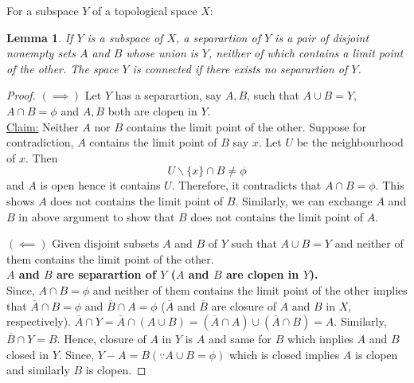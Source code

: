 \documentclass[12pt,reqno]{amsart}
\theoremstyle{plain}
\newtheorem{lem}{Lemma}
\theoremstyle{definition}
\begin{document}
\noindent For a subspace $Y$ of a topological space $X$:
\begin{lem}
    If $Y$ is a subspace of $X$, a separartion of $Y$ is a pair of disjoint nonempty sets $A$ and $B$ whose union is $Y$, neither of which contains a limit point of the other. The space $Y$ is connected if there exists no separartion of $Y$.
\end{lem}

\begin{proof}
    $(\implies)$ Let $Y$ has a separartion, say $A, B$, such that $A \cup B = Y$, $A \cap B = \phi$ and $A, B$ both are clopen in $Y$. \\
    \underline{Claim:} Neither $A$ nor $B$ contains the limit point of the other.
    Suppose for contradiction, $A$ contains the limit point of $B$ say $x$. Let $U$ be the neighbourhood of $x$. Then
    $$ U\backslash\{x\} \cap B \neq \phi$$
    and $A$ is open hence it contains $U$. Therefore, it contradicts that $A \cap B = \phi$. This shows $A$ does not contains the limit point of $B$. Similarly, we can exchange $A$ and $B$ in above argument to show that $B$ does not contains the limit point of $A$.

    \noindent $(\impliedby)$ Given disjoint subsets $A$ and $B$ of $Y$ such that $A \cup B = Y$ and neither of them contains the limit point of the other.\\  {\bf $A$ and $B$ are separartion of $Y$ ($A$ and $B$ are clopen in $Y$).} \\
    Since, $A \cap B = \phi$ and neither of them contains the limit point of the other implies that $\overline{A} \cap B = \phi$ and $\overline{B} \cap A = \phi$ ($\overline{A}$ and $\overline{B}$ are closure of $A$ and $B$ in $X$, respectively). $\overline{A} \cap Y = \overline{A} \cap (A \cup B) = (\overline{A} \cap A) \cup (\overline{A} \cap B) = A$. Similarly, $\overline{B} \cap Y = B$. Hence, closure of $A$ in $Y$ is $A$ and same for $B$ which implies $A$ and $B$ closed in $Y$. Since, $Y - A = B (\because A \cup B = \phi)$ which is closed implies $A$ is clopen and similarly $B$ is clopen. 
\end{proof}
\end{document}
